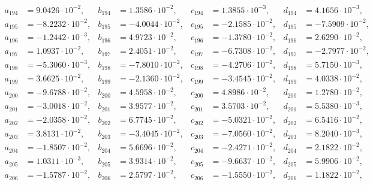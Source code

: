 \begin{align*}
  a_{ 194 } &= 9.0426 \cdot 10^{ -2 }, & b_{ 194 } &= 1.3586 \cdot 10^{ -2 }, & c_{ 194 } &= 1.3855 \cdot 10^{ -3 }, & d_{ 194 } &= 4.1656 \cdot 10^{ -3 }, \\ 
  a_{ 195 } &= -8.2232 \cdot 10^{ -2 }, & b_{ 195 } &= -4.0044 \cdot 10^{ -2 }, & c_{ 195 } &= -2.1585 \cdot 10^{ -2 }, & d_{ 195 } &= -7.5909 \cdot 10^{ -2 }, \\ 
  a_{ 196 } &= -1.2442 \cdot 10^{ -3 }, & b_{ 196 } &= 4.9723 \cdot 10^{ -2 }, & c_{ 196 } &= -1.3780 \cdot 10^{ -2 }, & d_{ 196 } &= 2.6290 \cdot 10^{ -2 }, \\ 
  a_{ 197 } &= 1.0937 \cdot 10^{ -2 }, & b_{ 197 } &= 2.4051 \cdot 10^{ -2 }, & c_{ 197 } &= -6.7308 \cdot 10^{ -2 }, & d_{ 197 } &= -2.7977 \cdot 10^{ -2 }, \\ 
  a_{ 198 } &= -5.3060 \cdot 10^{ -3 }, & b_{ 198 } &= -7.8010 \cdot 10^{ -2 }, & c_{ 198 } &= -4.2706 \cdot 10^{ -2 }, & d_{ 198 } &= 5.7150 \cdot 10^{ -3 }, \\ 
  a_{ 199 } &= 3.6625 \cdot 10^{ -2 }, & b_{ 199 } &= -2.1360 \cdot 10^{ -2 }, & c_{ 199 } &= -3.4545 \cdot 10^{ -2 }, & d_{ 199 } &= 4.0338 \cdot 10^{ -2 }, \\ 
  a_{ 200 } &= -9.6788 \cdot 10^{ -2 }, & b_{ 200 } &= 4.5958 \cdot 10^{ -2 }, & c_{ 200 } &= 4.8986 \cdot 10^{ -2 }, & d_{ 200 } &= 1.2780 \cdot 10^{ -2 }, \\ 
  a_{ 201 } &= -3.0018 \cdot 10^{ -2 }, & b_{ 201 } &= 3.9577 \cdot 10^{ -2 }, & c_{ 201 } &= 3.5703 \cdot 10^{ -2 }, & d_{ 201 } &= 5.5380 \cdot 10^{ -3 }, \\ 
  a_{ 202 } &= -2.0358 \cdot 10^{ -2 }, & b_{ 202 } &= 6.7745 \cdot 10^{ -2 }, & c_{ 202 } &= -5.0321 \cdot 10^{ -2 }, & d_{ 202 } &= 6.5416 \cdot 10^{ -2 }, \\ 
  a_{ 203 } &= 3.8131 \cdot 10^{ -2 }, & b_{ 203 } &= -3.4045 \cdot 10^{ -2 }, & c_{ 203 } &= -7.0560 \cdot 10^{ -2 }, & d_{ 203 } &= 8.2040 \cdot 10^{ -3 }, \\ 
  a_{ 204 } &= -1.8507 \cdot 10^{ -2 }, & b_{ 204 } &= 5.6696 \cdot 10^{ -2 }, & c_{ 204 } &= -2.4271 \cdot 10^{ -2 }, & d_{ 204 } &= 2.1822 \cdot 10^{ -2 }, \\ 
  a_{ 205 } &= 1.0311 \cdot 10^{ -3 }, & b_{ 205 } &= 3.9314 \cdot 10^{ -2 }, & c_{ 205 } &= -9.6637 \cdot 10^{ -2 }, & d_{ 205 } &= 5.9906 \cdot 10^{ -2 }, \\ 
  a_{ 206 } &= -1.5787 \cdot 10^{ -2 }, & b_{ 206 } &= 2.5797 \cdot 10^{ -2 }, & c_{ 206 } &= -1.5550 \cdot 10^{ -2 }, & d_{ 206 } &= 1.1822 \cdot 10^{ -2 }, \\ 

\end{align*}
